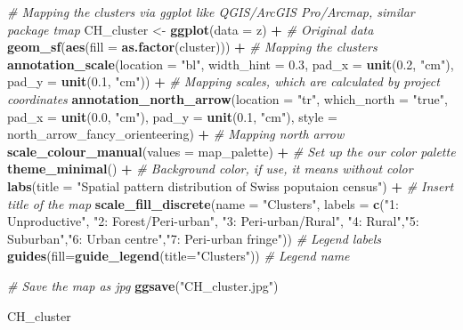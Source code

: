 \documentclass[
]{book}
\newenvironment{Shaded}{\begin{snugshade}}{\end{snugshade}}
\newcommand{\AttributeTok}[1]{\textcolor[rgb]{0.13,0.29,0.53}{#1}}
\newcommand{\CommentTok}[1]{\textcolor[rgb]{0.56,0.35,0.01}{\textit{#1}}}
\newcommand{\FloatTok}[1]{\textcolor[rgb]{0.00,0.00,0.81}{#1}}
\newcommand{\FunctionTok}[1]{\textcolor[rgb]{0.13,0.29,0.53}{\textbf{#1}}}
\newcommand{\NormalTok}[1]{#1}
\newcommand{\OtherTok}[1]{\textcolor[rgb]{0.56,0.35,0.01}{#1}}
\newcommand{\SpecialCharTok}[1]{\textcolor[rgb]{0.81,0.36,0.00}{\textbf{#1}}}
\newcommand{\StringTok}[1]{\textcolor[rgb]{0.31,0.60,0.02}{#1}}
\begin{document}
\begin{Shaded}
\begin{Highlighting}[]
\CommentTok{\# Mapping the clusters via ggplot like QGIS/ArcGIS Pro/Arcmap, similar package \textquotesingle{}tmap\textquotesingle{}}
\NormalTok{CH\_cluster }\OtherTok{\textless{}{-}} \FunctionTok{ggplot}\NormalTok{(}\AttributeTok{data =}\NormalTok{ z) }\SpecialCharTok{+} \CommentTok{\# Original data}
    \FunctionTok{geom\_sf}\NormalTok{(}\FunctionTok{aes}\NormalTok{(}\AttributeTok{fill =} \FunctionTok{as.factor}\NormalTok{(cluster))) }\SpecialCharTok{+} \CommentTok{\# Mapping the clusters}
    \FunctionTok{annotation\_scale}\NormalTok{(}\AttributeTok{location =} \StringTok{"bl"}\NormalTok{, }\AttributeTok{width\_hint =} \FloatTok{0.3}\NormalTok{,}
                     \AttributeTok{pad\_x =} \FunctionTok{unit}\NormalTok{(}\FloatTok{0.2}\NormalTok{, }\StringTok{"cm"}\NormalTok{), }\AttributeTok{pad\_y =} \FunctionTok{unit}\NormalTok{(}\FloatTok{0.1}\NormalTok{, }\StringTok{"cm"}\NormalTok{)) }\SpecialCharTok{+} \CommentTok{\# Mapping scales, which are calculated by project coordinates}
    \FunctionTok{annotation\_north\_arrow}\NormalTok{(}\AttributeTok{location =} \StringTok{"tr"}\NormalTok{, }\AttributeTok{which\_north =} \StringTok{"true"}\NormalTok{, }
          \AttributeTok{pad\_x =} \FunctionTok{unit}\NormalTok{(}\FloatTok{0.0}\NormalTok{, }\StringTok{"cm"}\NormalTok{), }\AttributeTok{pad\_y =} \FunctionTok{unit}\NormalTok{(}\FloatTok{0.1}\NormalTok{, }\StringTok{"cm"}\NormalTok{),}
          \AttributeTok{style =}\NormalTok{ north\_arrow\_fancy\_orienteering) }\SpecialCharTok{+} \CommentTok{\# Mapping north arrow}
    \FunctionTok{scale\_colour\_manual}\NormalTok{(}\AttributeTok{values =}\NormalTok{ map\_palette) }\SpecialCharTok{+} \CommentTok{\# Set up the our color palette}
    \FunctionTok{theme\_minimal}\NormalTok{() }\SpecialCharTok{+} \CommentTok{\# Background color, if use, it means without color}
    \FunctionTok{labs}\NormalTok{(}\AttributeTok{title =} \StringTok{"Spatial pattern distribution of Swiss poputaion census"}\NormalTok{) }\SpecialCharTok{+} \CommentTok{\# Insert title of the map}
    \FunctionTok{scale\_fill\_discrete}\NormalTok{(}\AttributeTok{name =} \StringTok{"Clusters"}\NormalTok{, }
                        \AttributeTok{labels =} \FunctionTok{c}\NormalTok{(}\StringTok{"1: Unproductive"}\NormalTok{, }\StringTok{"2: Forest/Peri{-}urban"}\NormalTok{, }\StringTok{"3: Peri{-}urban/Rural"}\NormalTok{,}
                                 \StringTok{"4: Rural"}\NormalTok{,}\StringTok{"5: Suburban"}\NormalTok{,}\StringTok{"6: Urban centre"}\NormalTok{,}\StringTok{"7: Peri{-}urban fringe"}\NormalTok{)) }\CommentTok{\# Legend labels}
    \FunctionTok{guides}\NormalTok{(}\AttributeTok{fill=}\FunctionTok{guide\_legend}\NormalTok{(}\AttributeTok{title=}\StringTok{"Clusters"}\NormalTok{)) }\CommentTok{\# Legend name}

\CommentTok{\# Save the map as jpg}
\FunctionTok{ggsave}\NormalTok{(}\StringTok{"CH\_cluster.jpg"}\NormalTok{)}
    
\NormalTok{CH\_cluster}
\end{Highlighting}
\end{Shaded}
\end{document}
